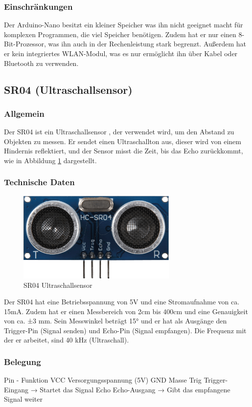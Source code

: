 \subsubsection{Einschränkungen}
Der Arduino-Nano besitzt ein kleiner Speicher was ihn nicht geeignet macht für komplexen Programmen, die viel Speicher benötigen.
%
Zudem hat er nur einen 8-Bit-Prozessor, was ihn auch in der Rechenleistung stark begrenzt.
%
Außerdem hat er kein integriertes WLAN-Modul, 
was es nur ermöglicht ihn  über Kabel oder Bluetooth zu verwenden.
%
\subsection{SR04 (Ultraschallsensor)}
%
\subsubsection{Allgemein}
Der SR04 ist ein Ultraschallsensor \cite{sr04-datasheet},
der verwendet wird, um den Abstand zu Objekten zu messen.
%
Er sendet einen Ultraschallton aus,
dieser wird von einem Hindernis reflektiert,
und der Sensor misst die Zeit,
bis das Echo zurückkommt,
wie in Abbildung \ref{fig:sr04} dargestellt.
\subsubsection{Technische Daten}
\begin{figure}[H]
    \centering
    \includegraphics[width=0.7\textwidth]{img/Hardware/sr04.png}
    \caption{SR04 Ultraschallsensor}
    \label{fig:sr04}
\end{figure}
Der SR04 hat eine Betriebsspannung von 5V und eine Stromaufnahme von ca. 15mA.
%
Zudem hat er einen Messbereich von 2cm bis 400cm und eine Genauigkeit von ca. ±3 mm.
%
Sein Messwinkel beträgt 15°
und er hat als Ausgänge den Trigger-Pin (Signal senden) und Echo-Pin (Signal empfangen). 
%
Die Frequenz mit der er arbeitet, sind 40 kHz (Ultraschall).
\subsubsection{Belegung}
Pin  -   	Funktion
VCC	Versorgungsspannung (5V)
GND	Masse
Trig	Trigger-Eingang → Startet das Signal
Echo	Echo-Ausgang → Gibt das empfangene Signal weiter
